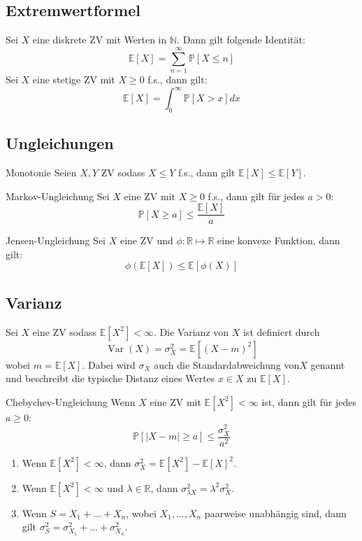 \documentclass[a4paper,10pt]{article}
\def\R{\mathbb{R}}
\def\P{\mathbb{P}}
\def\E{\mathbb{E}}
\DeclareMathOperator{\Var}{\text{Var}}
\begin{document}
\subsection{Extremwertformel}
Sei \(X\) eine diskrete ZV mit Werten in \(\mathbb{N}\). Dann gilt folgende Identität:
\[\E[X] = \sum_{n=1}^\infty \P[X\le n]\]
Sei \(X\) eine stetige ZV mit \(X \ge 0\) f.s., dann gilt:
\[\E[X] = \int_0^\infty \P[X > x] dx\]

\subsection{Ungleichungen}
\begin{subbox}{Monotonie}
    Seien \(X, Y\) ZV sodass \(X \le Y\) f.s., dann gilt \(\E[X] \le \E[Y]\).
\end{subbox}

\begin{mainbox}{Markov-Ungleichung}
    Sei \(X\) eine ZV mit \(X \ge 0\) f.s., dann gilt für jedes \(a > 0\):
    \[\P[X\ge a] \le \frac{\E[X]}{a}\]
\end{mainbox}

\begin{subbox}{Jensen-Ungleichung}
    Sei \(X\) eine ZV und \(\phi : \R \mapsto \R\) eine konvexe Funktion, dann gilt:
    \[\phi(\E[X]) \le \E[\phi(X)]\]
\end{subbox}

\subsection{Varianz}
Sei \(X\) eine ZV sodass \(\E[X^2] < \infty\). Die Varianz von \(X\) ist definiert durch
\[\Var(X) = \sigma_X^2 = \E[(X-m)^2]\]
wobei \(m=\E[X]\). Dabei wird \(\sigma_X\) auch die Standardabweichung von\(X\) genannt und beschreibt die typische Distanz eines Wertes \(x\in X\) zu \(\E[X]\).

\begin{subbox}{Chebychev-Ungleichung}
    Wenn \(X\) eine ZV mit \(\E[X^2] < \infty\) ist, dann gilt für jedes \(a \ge 0\):
    \[\P[|X - m| \ge a] \le \frac{\sigma_X^2}{a^2}\]
\end{subbox}

\begin{enumerate}
    \item Wenn \(\E[X^2] < \infty\), dann \(\sigma_X^2 = \E[X^2] - \E[X]^2\).
    \item Wenn \(\E[X^2] < \infty\) und \(\lambda \in \R\), dann \(\sigma_{\lambda X}^2 = \lambda^2\sigma_X^2\).
    \item Wenn \(S = X_1 + \ldots + X_n\), wobei \(X_1, \ldots, X_n\) paarweise unabhängig sind, dann gilt \(\sigma_S^2 = \sigma_{X_1}^2 + \ldots + \sigma_{X_n}^2\).
\end{enumerate}
\end{document}
